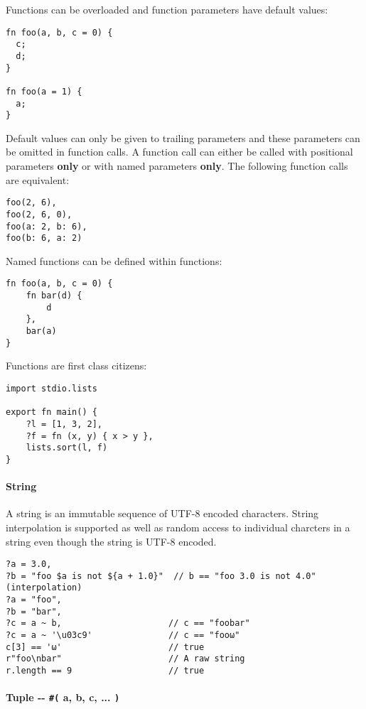 Functions can be overloaded and function parameters have default values:

\begin{verbatim}
fn foo(a, b, c = 0) {
  c;
  d;
}

fn foo(a = 1) {
  a;
}
\end{verbatim}

Default values can only be given to trailing parameters and these
parameters can be omitted in function calls. A function call can either
be called with positional parameters \textbf{only} or with named
parameters \textbf{only}. The following function calls are equivalent:

\begin{verbatim}
foo(2, 6),
foo(2, 6, 0),
foo(a: 2, b: 6),
foo(b: 6, a: 2)
\end{verbatim}

Named functions can be defined within functions:

\begin{verbatim}
fn foo(a, b, c = 0) {
    fn bar(d) {
        d
    },
    bar(a)
}
\end{verbatim}

Functions are first class citizens:

\begin{verbatim}
import stdio.lists

export fn main() {
    ?l = [1, 3, 2],
    ?f = fn (x, y) { x > y },
    lists.sort(l, f)
}
\end{verbatim}

\hypertarget{string}{%
\paragraph{String}\label{string}}

A string is an immutable sequence of UTF-8 encoded characters. String
interpolation is supported as well as random access to individual
charcters in a string even though the string is UTF-8 encoded.

\begin{verbatim}
?a = 3.0,
?b = "foo $a is not ${a + 1.0}"  // b == "foo 3.0 is not 4.0" (interpolation)
?a = "foo",
?b = "bar",
?c = a ~ b,                     // c == "foobar"
?c = a ~ '\u03c9'               // c == "fooω"
c[3] == 'ω'                     // true
r"foo\nbar"                     // A raw string
r.length == 9                   // true
\end{verbatim}

\hypertarget{tuple-----a-b-c--}{%
\paragraph{\texorpdfstring{Tuple -\/- \texttt{\#(} a, b, c, ...
\texttt{)}}{Tuple -\/- \#( a, b, c, ... )}}\label{tuple-----a-b-c--}}

